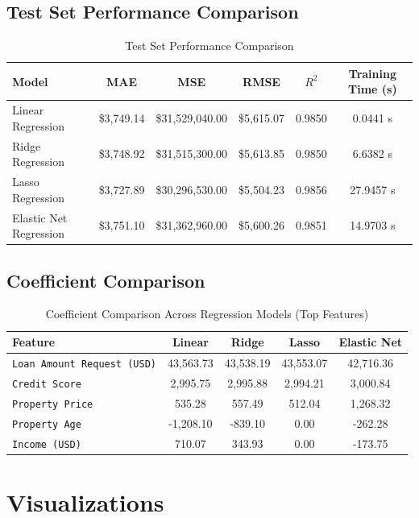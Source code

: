\documentclass[12pt,a4paper]{article}
\begin{document}
\subsection{Test Set Performance Comparison}
\begin{table}[!htbp]
\centering
\caption{Test Set Performance Comparison}
\begin{tabular}{lccccc}
\toprule
Model & MAE & MSE & RMSE & $R^2$ & Training Time (s) \\
\midrule
Linear Regression & \$3,749.14 & \$31,529,040.00 & \$5,615.07 & 0.9850 & 0.0441 s \\
Ridge Regression & \$3,748.92 & \$31,515,300.00 & \$5,613.85 & 0.9850 & 6.6382 s \\
Lasso Regression & \$3,727.89 & \$30,296,530.00 & \$5,504.23 & 0.9856 & 27.9457 s \\
Elastic Net Regression & \$3,751.10 & \$31,362,960.00 & \$5,600.26 & 0.9851 & 14.9703 s \\
\bottomrule
\end{tabular}
\end{table}

\subsection{Coefficient Comparison}
\begin{table}[!htbp]
\centering
\caption{Coefficient Comparison Across Regression Models (Top Features)}
\begin{tabular}{lcccc}
\toprule
Feature & Linear & Ridge & Lasso & Elastic Net \\
\midrule
\texttt{Loan Amount Request (USD)} & 43,563.73 & 43,538.19 & 43,553.07 & 42,716.36 \\
\texttt{Credit Score} & 2,995.75 & 2,995.88 & 2,994.21 & 3,000.84 \\
\texttt{Property Price} & 535.28 & 557.49 & 512.04 & 1,268.32 \\
\texttt{Property Age} & -1,208.10 & -839.10 & 0.00 & -262.28 \\
\texttt{Income (USD)} & 710.07 & 343.93 & 0.00 & -173.75 \\
\bottomrule
\end{tabular}
\end{table}

\section{Visualizations}
\end{document}
